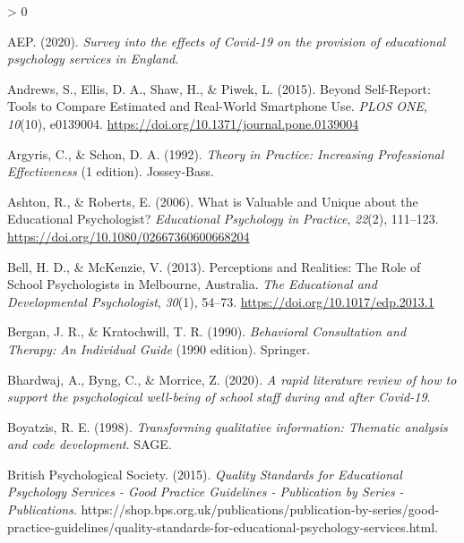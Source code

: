 \documentclass[
  english,
  man]{apa}
\newlength{\cslhangindent}
\newenvironment{CSLReferences}[2] %
 {%
  \setlength{\parindent}{0pt}
  \ifodd #1 \everypar{\setlength{\hangindent}{\cslhangindent}}\ignorespaces\fi
  \ifnum #2 > 0
  \setlength{\parskip}{#2\baselineskip}
  \fi
 }%
 {}
\begin{document}
\hypertarget{refs}{}
\begin{CSLReferences}{1}{0}
\leavevmode\hypertarget{ref-aepSurveyEffectsCovid192020}{}%
AEP. (2020). \emph{Survey into the effects of {Covid}-19 on the provision of educational psychology services in {England}}.

\leavevmode\hypertarget{ref-andrewsSelfReportToolsCompare2015a}{}%
Andrews, S., Ellis, D. A., Shaw, H., \& Piwek, L. (2015). Beyond {Self}-{Report}: {Tools} to {Compare Estimated} and {Real}-{World Smartphone Use}. \emph{PLOS ONE}, \emph{10}(10), e0139004. \url{https://doi.org/10.1371/journal.pone.0139004}

\leavevmode\hypertarget{ref-argyrisTheoryPracticeIncreasing1992}{}%
Argyris, C., \& Schon, D. A. (1992). \emph{Theory in {Practice}: {Increasing Professional Effectiveness}} (1 edition). {Jossey-Bass}.

\leavevmode\hypertarget{ref-ashtonWhatValuableUnique2006}{}%
Ashton, R., \& Roberts, E. (2006). What is {Valuable} and {Unique} about the {Educational Psychologist}? \emph{Educational Psychology in Practice}, \emph{22}(2), 111--123. \url{https://doi.org/10.1080/02667360600668204}

\leavevmode\hypertarget{ref-bellPerceptionsRealitiesRole2013}{}%
Bell, H. D., \& McKenzie, V. (2013). Perceptions and {Realities}: {The Role} of {School Psychologists} in {Melbourne}, {Australia}. \emph{The Educational and Developmental Psychologist}, \emph{30}(1), 54--73. \url{https://doi.org/10.1017/edp.2013.1}

\leavevmode\hypertarget{ref-berganBehavioralConsultationTherapy1990}{}%
Bergan, J. R., \& Kratochwill, T. R. (1990). \emph{Behavioral {Consultation} and {Therapy}: {An Individual Guide}} (1990 edition). {Springer}.

\leavevmode\hypertarget{ref-bhardwajRapidLiteratureReview2020}{}%
Bhardwaj, A., Byng, C., \& Morrice, Z. (2020). \emph{A rapid literature review of how to support the psychological well-being of school staff during and after {Covid}-19}.

\leavevmode\hypertarget{ref-boyatzisTransformingQualitativeInformation1998a}{}%
Boyatzis, R. E. (1998). \emph{Transforming qualitative information: Thematic analysis and code development}. {SAGE}.

\leavevmode\hypertarget{ref-britishpsychologicalsocietyQualityStandardsEducational2015}{}%
British Psychological Society. (2015). \emph{Quality {Standards} for {Educational Psychology Services} - {Good Practice Guidelines} - {Publication} by {Series} - {Publications}}. https://shop.bps.org.uk/publications/publication-by-series/good-practice-guidelines/quality-standards-for-educational-psychology-services.html.


\end{CSLReferences}
\end{document}

